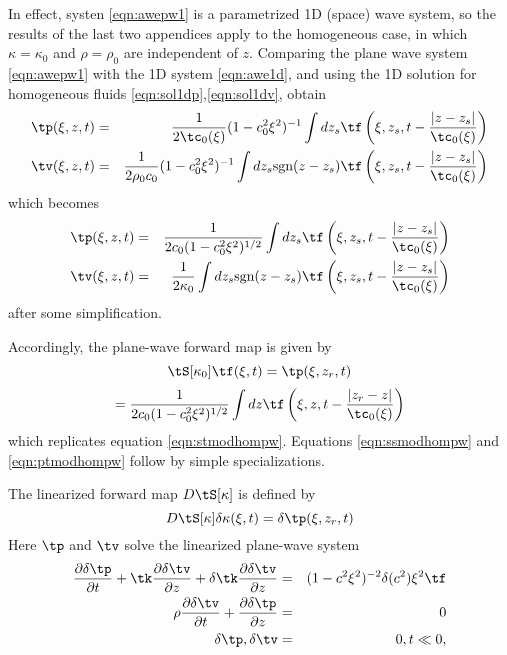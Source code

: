 In effect, systen \ref{eqn:awepw1} is a parametrized 1D (space) wave
system, so the results of the last two appendices apply to the
homogeneous case, in which $\kappa=\kappa_0$ and $\rho=\rho_0$ are
independent of $z$. Comparing the plane wave system \ref{eqn:awepw1} with the 1D system
\ref{eqn:awe1d}, and using the 1D solution for homogeneous fluids
\ref{eqn:sol1dp},\ref{eqn:sol1dv}, obtain
\begin{eqnarray*}
\tp(\xi,z,t) &=& \frac{1}{2\tc_0(\xi)}(1-c_0^2\xi^2)^{-1}\int dz_s
                 \tf\left(\xi,z_s,t -
                 \frac{|z-z_s|}{\tc_0(\xi)}\right) \nonumber \\
\tv(\xi,z,t) &=& \frac{1}{2\rho_0 c_0}(1-c_0^2\xi^2)^{-1} \int dz_s \mbox{sgn} (z-z_s)\tf\left(\xi,z_s,t - \frac{|z-z_s|}{\tc_0(\xi)}\right)
           \nonumber \\
\end{eqnarray*}
which becomes
\begin{eqnarray}
\label{eqn:solpwp}
 \tp(\xi,z,t)   &=&\frac{1}{2c_0(1-c_0^2\xi^2)^{1/2}}\int dz_s 
                 \tf\left(\xi,z_s,t -
                    \frac{|z-z_s|}{\tc_0(\xi)}\right)  \\
  \label{eqn:solpwv}
\tv(\xi,z,t) &=& \frac{1}{2\kappa_0} \int dz_s \mbox{sgn} (z-z_s)\tf\left(\xi,z_s,t - \frac{|z-z_s|}{\tc_0(\xi)}\right)
\end{eqnarray}
after some simplification.

Accordingly, the plane-wave forward map is given by
\[
  \tS[\kappa_0]\tf(\xi,t) =\tp(\xi,z_r,t)
\]
\begin{equation}
\label{eqn:fwdpw1}
= \frac{1}{2c_0(1-c_0^2\xi^2)^{1/2}}\int dz \tf\left(\xi,z,t -
  \frac{|z_r-z|}{\tc_0(\xi)}\right)
\end{equation}
which replicates equation \ref{eqn:stmodhompw}. Equations
\ref{eqn:ssmodhompw} and \ref{eqn:ptmodhompw} follow by simple specializations.

The linearized forward map $D\tS[\kappa]$ is defined by
\begin{equation}
  \label{eqn:dfwdpw}
  D\tS[\kappa]\delta \kappa(\xi,t) = \delta \tp(\xi,z_r,t)
\end{equation}
Here $\tp$ and $\tv$ solve the linearized plane-wave system
\begin{eqnarray}
\label{eqn:dawepw1}
\frac{\partial \delta\tp}{\partial t} + \tk\frac{\partial
  \delta \tv}{\partial z} +  \delta \tk\frac{\partial
  \delta \tv}{\partial z}  &=& (1-c^2\xi^2)^{-2}\delta (c^2)\xi^2\tf \nonumber\\
\rho \frac{\partial \delta \tv}{\partial t} + \frac{\partial \delta \tp}{\partial
  z}&=&0\nonumber\\
\delta \tp,\delta \tv&=&0, t \ll 0,
\end{eqnarray}


